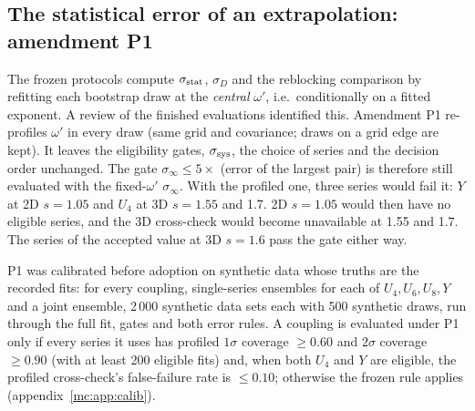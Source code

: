 \subsection{The statistical error of an extrapolation: amendment P1}\label{mc:sec:p1}
The frozen protocols compute $\sigma_{\rm stat}$, $\sigma_D$ and the reblocking comparison by refitting each bootstrap draw at the \emph{central}
$\omega'$, i.e.\ conditionally on a fitted exponent. A review of the finished evaluations identified this. Amendment P1
re-profiles $\omega'$ in every draw (same grid and covariance; draws on a grid edge are kept). It leaves the eligibility gates, $\sigma_{\rm sys}$, the
choice of series and the decision order unchanged. The gate $\sigma_\infty\le5\times$ (error of the largest pair) is therefore still evaluated
with the fixed-$\omega'$ $\sigma_\infty$. With the profiled one, three series would fail it: $Y$ at 2D $s=1.05$ and $U_4$ at 3D $s=1.55$ and
1.7. 2D $s=1.05$ would then have no eligible series, and the 3D cross-check would become unavailable at 1.55 and 1.7. The series of the
accepted value at 3D $s=1.6$ pass the gate either way.

P1 was calibrated before adoption on synthetic data whose truths are the recorded fits: for every coupling, single-series ensembles for each
of $U_4,U_6,U_8,Y$ and a joint ensemble, 2\,000 synthetic data sets each with 500 synthetic draws, run through the full fit, gates and both error
rules. A coupling is evaluated under P1 only if every series it uses has profiled $1\sigma$ coverage $\ge0.60$ and $2\sigma$ coverage $\ge0.90$
(with at least 200 eligible fits) and, when both $U_4$ and $Y$ are eligible, the profiled cross-check's false-failure rate is $\le0.10$;
otherwise the frozen rule applies (appendix~\ref{mc:app:calib}).

